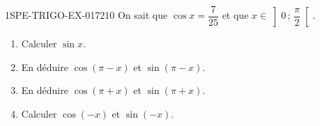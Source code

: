 \begin{exercice}{1SPE-TRIGO-EX-017}{2}{10}
On sait que $\cos x = \dfrac{7}{25}$ et que $x \in \left]0\,;\,\dfrac{\pi}{2}\right[$.
\begin{enumerate}
  \item Calculer $\sin x$.
  \item En déduire $\cos(\pi - x)$ et $\sin(\pi - x)$.
  \item En déduire $\cos(\pi + x)$ et $\sin(\pi + x)$.
  \item Calculer $\cos(-x)$ et $\sin(-x)$.
\end{enumerate}
\end{exercice}
